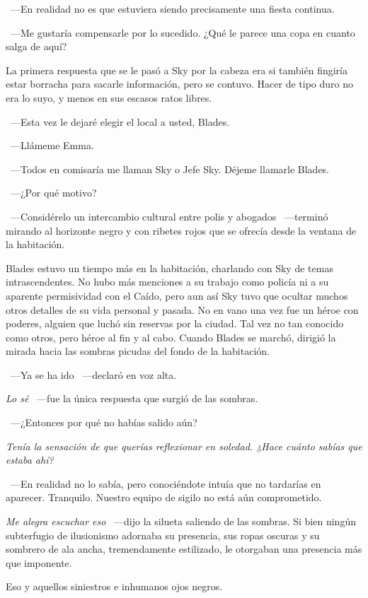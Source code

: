 ~---En realidad no es que estuviera siendo precisamente una fiesta continua.

~---Me gustaría compensarle por lo sucedido. ¿Qué le parece una copa en cuanto salga de aquí?

La primera respuesta que se le pasó a Sky por la cabeza era si también fingiría estar borracha para sacarle información, pero se contuvo. Hacer de tipo duro no era lo suyo, y menos en sus escasos ratos libres.

~---Esta vez le dejaré elegir el local a usted, Blades.

~---Llámeme Emma.

~---Todos en comisaría me llaman Sky o Jefe Sky. Déjeme llamarle Blades.

~---¿Por qué motivo?

~---Considérelo un intercambio cultural entre polis y abogados ~---terminó mirando al horizonte negro y con ribetes rojos que se ofrecía desde la ventana de la habitación.

\bigskip\noindent
Blades estuvo un tiempo más en la habitación, charlando con Sky de temas intrascendentes. No hubo más menciones a su trabajo como policía ni a su aparente permisividad con el Caído, pero aun así Sky tuvo que ocultar muchos otros detalles de su vida personal y pasada. No en vano una vez fue un héroe con poderes, alguien que luchó sin reservas por la ciudad. Tal vez no tan conocido como otros, pero héroe al fin y al cabo.
Cuando Blades se marchó, dirigió la mirada hacia las sombras picudas del fondo de la habitación.

~---Ya se ha ido ~---declaró en voz alta.

\emph{Lo sé} ~---fue la única respuesta que surgió de las sombras.

~---¿Entonces por qué no habías salido aún?

\emph{Tenía la sensación de que querías reflexionar en soledad. ¿Hace cuánto sabías que estaba ahí?}

~---En realidad no lo sabía, pero conociéndote intuía que no tardarías en aparecer. Tranquilo. Nuestro equipo de sigilo no está aún comprometido.

\emph{Me alegra escuchar eso} ~---dijo la silueta saliendo de las sombras. Si bien ningún subterfugio de ilusionismo adornaba su presencia, sus ropas oscuras y su sombrero de ala ancha, tremendamente estilizado, le otorgaban una presencia más que imponente.

Eso y aquellos siniestros e inhumanos ojos negros.

